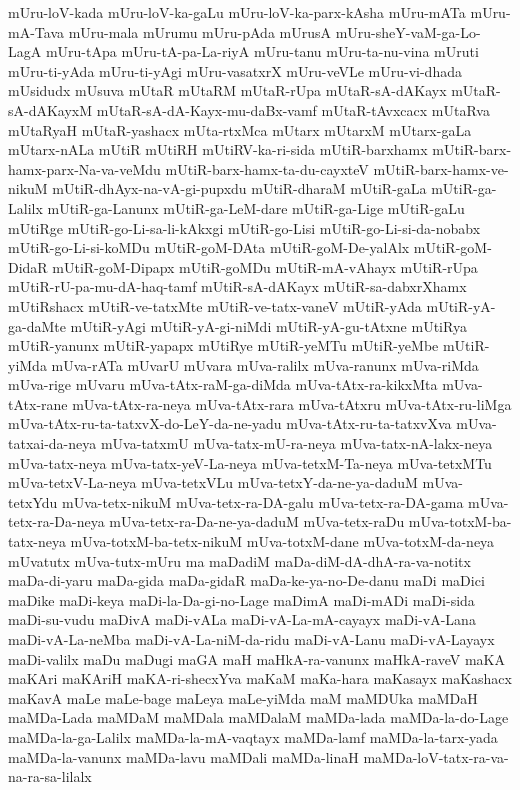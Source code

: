 {mUru-loV-kada
mUru-loV-ka-gaLu
mUru-loV-ka-parx-kAsha
mUru-mATa
mUru-mA-Tava
mUru-mala
mUrumu
mUru-pAda
mUrusA
mUru-sheY-vaM-ga-Lo-LagA
mUru-tApa
mUru-tA-pa-La-riyA
mUru-tanu
mUru-ta-nu-vina
mUruti
mUru-ti-yAda
mUru-ti-yAgi
mUru-vasatxrX
mUru-veVLe
mUru-vi-dhada
mUsidudx
mUsuva
mUtaR
mUtaRM
mUtaR-rUpa
mUtaR-sA-dAKayx
mUtaR-sA-dAKayxM
mUtaR-sA-dA-Kayx-mu-daBx-vamf
mUtaR-tAvxcacx
mUtaRva
mUtaRyaH
mUtaR-yashacx
mUta-rtxMca
mUtarx
mUtarxM
mUtarx-gaLa
mUtarx-nALa
mUtiR
mUtiRH
mUtiRV-ka-ri-sida
mUtiR-barxhamx
mUtiR-barx-hamx-parx-Na-va-veMdu
mUtiR-barx-hamx-ta-du-cayxteV
mUtiR-barx-hamx-ve-nikuM
mUtiR-dhAyx-na-vA-gi-pupxdu
mUtiR-dharaM
mUtiR-gaLa
mUtiR-ga-Lalilx
mUtiR-ga-Lanunx
mUtiR-ga-LeM-dare
mUtiR-ga-Lige
mUtiR-gaLu
mUtiRge
mUtiR-go-Li-sa-li-kAkxgi
mUtiR-go-Lisi
mUtiR-go-Li-si-da-nobabx
mUtiR-go-Li-si-koMDu
mUtiR-goM-DAta
mUtiR-goM-De-yalAlx
mUtiR-goM-DidaR
mUtiR-goM-Dipapx
mUtiR-goMDu
mUtiR-mA-vAhayx
mUtiR-rUpa
mUtiR-rU-pa-mu-dA-haq-tamf
mUtiR-sA-dAKayx
mUtiR-sa-dabxrXhamx
mUtiRshacx
mUtiR-ve-tatxMte
mUtiR-ve-tatx-vaneV
mUtiR-yAda
mUtiR-yA-ga-daMte
mUtiR-yAgi
mUtiR-yA-gi-niMdi
mUtiR-yA-gu-tAtxne
mUtiRya
mUtiR-yanunx
mUtiR-yapapx
mUtiRye
mUtiR-yeMTu
mUtiR-yeMbe
mUtiR-yiMda
mUva-rATa
mUvarU
mUvara
mUva-ralilx
mUva-ranunx
mUva-riMda
mUva-rige
mUvaru
mUva-tAtx-raM-ga-diMda
mUva-tAtx-ra-kikxMta
mUva-tAtx-rane
mUva-tAtx-ra-neya
mUva-tAtx-rara
mUva-tAtxru
mUva-tAtx-ru-liMga
mUva-tAtx-ru-ta-tatxvX-do-LeY-da-ne-yadu
mUva-tAtx-ru-ta-tatxvXva
mUva-tatxai-da-neya
mUva-tatxmU
mUva-tatx-mU-ra-neya
mUva-tatx-nA-lakx-neya
mUva-tatx-neya
mUva-tatx-yeV-La-neya
mUva-tetxM-Ta-neya
mUva-tetxMTu
mUva-tetxV-La-neya
mUva-tetxVLu
mUva-tetxY-da-ne-ya-daduM
mUva-tetxYdu
mUva-tetx-nikuM
mUva-tetx-ra-DA-galu
mUva-tetx-ra-DA-gama
mUva-tetx-ra-Da-neya
mUva-tetx-ra-Da-ne-ya-daduM
mUva-tetx-raDu
mUva-totxM-ba-tatx-neya
mUva-totxM-ba-tetx-nikuM
mUva-totxM-dane
mUva-totxM-da-neya
mUvatutx
mUva-tutx-mUru
ma
maDadiM
maDa-diM-dA-dhA-ra-va-notitx
maDa-di-yaru
maDa-gida
maDa-gidaR
maDa-ke-ya-no-De-danu
maDi
maDici
maDike
maDi-keya
maDi-la-Da-gi-no-Lage
maDimA
maDi-mADi
maDi-sida
maDi-su-vudu
maDivA
maDi-vALa
maDi-vA-La-mA-cayayx
maDi-vA-Lana
maDi-vA-La-neMba
maDi-vA-La-niM-da-ridu
maDi-vA-Lanu
maDi-vA-Layayx
maDi-valilx
maDu
maDugi
maGA
maH
maHkA-ra-vanunx
maHkA-raveV
maKA
maKAri
maKAriH
maKA-ri-shecxYva
maKaM
maKa-hara
maKasayx
maKashacx
maKavA
maLe
maLe-bage
maLeya
maLe-yiMda
maM
maMDUka
maMDaH
maMDa-Lada
maMDaM
maMDala
maMDalaM
maMDa-lada
maMDa-la-do-Lage
maMDa-la-ga-Lalilx
maMDa-la-mA-vaqtayx
maMDa-lamf
maMDa-la-tarx-yada
maMDa-la-vanunx
maMDa-lavu
maMDali
maMDa-linaH
maMDa-loV-tatx-ra-va-na-ra-sa-lilalx
}
